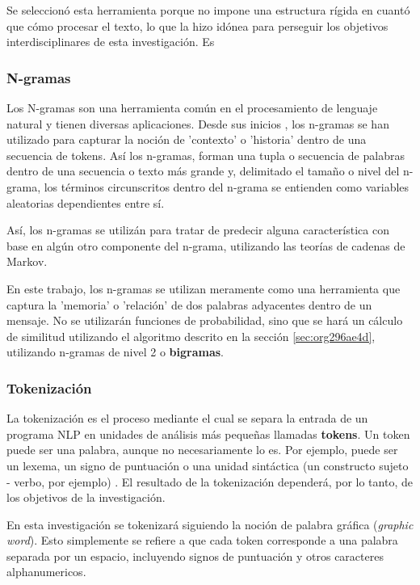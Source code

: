 \documentclass[12pt,letterpaper,twoside]{article}
\begin{document}
Se seleccionó esta herramienta porque no impone una estructura
rígida en cuantó que cómo procesar el texto, lo que la hizo
idónea para perseguir los objetivos interdisciplinares de esta
investigación. Es

\subsubsection{N-gramas}
\label{sec:orgbf4e16f}

Los N-gramas son una herramienta común en el procesamiento
de lenguaje natural y tienen diversas aplicaciones. Desde sus
inicios \cite{manning1999foundations}, los n-gramas se han
utilizado para capturar la noción de 'contexto' o 'historia'
dentro de una secuencia de tokens. Así los n-gramas, forman
una tupla o secuencia de palabras dentro de una secuencia
o texto más grande y, delimitado el tamaño o nivel del
n-grama, los términos circunscritos dentro del n-grama
se entienden como variables aleatorias dependientes entre sí.

Así, los n-gramas se utilizán para tratar de predecir alguna
característica con base en algún otro componente del n-grama,
utilizando las teorías de cadenas de Markov.

En este trabajo, los n-gramas se utilizan meramente
como una herramienta que captura la 'memoria' o 'relación'
de dos palabras adyacentes dentro de un mensaje. No se
utilizarán funciones de probabilidad, sino que se hará
un cálculo de similitud utilizando el algoritmo descrito
en la sección  \ref{sec:org296ae4d}, utilizando
n-gramas de nivel 2 o \textbf{bigramas}.


\subsubsection{Tokenización}
\label{sec:org3c5591a}
La tokenización es el proceso mediante el cual se separa la entrada
de un programa NLP en unidades de análisis más pequeñas llamadas
\textbf{tokens}. Un token puede ser una palabra, aunque no necesariamente
lo es. Por ejemplo, puede ser un lexema, un signo de puntuación
o una unidad sintáctica (un constructo sujeto - verbo, por ejemplo)
\cite{manning1999foundations}. El resultado de la tokenización
dependerá, por lo tanto, de los objetivos de la investigación.

En esta investigación se tokenizará siguiendo la noción de
palabra gráfica (\emph{graphic word}). Esto simplemente se refiere
a que cada token corresponde a una palabra separada por un espacio,
incluyendo signos de puntuación y otros caracteres alphanumericos.
\end{document}
